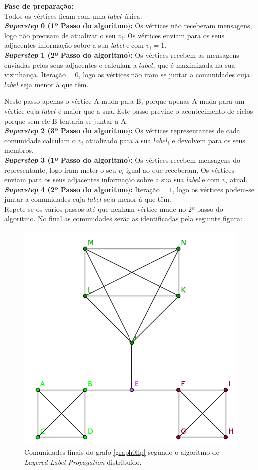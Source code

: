 {\bf Fase de preparação:}\\
Todos os vértices ficam com uma $label$ única. 
\\[0.25cm]
{\bf \textit{Superstep} 0  (1º Passo do algoritmo):}
Os vértices não receberam mensagens, logo não precisam de atualizar o seu $v_i$.
Os vértices enviam para os seus adjacentes informação sobre a sua 
\textit{label} e com $v_i=1$.
\\[0.25cm]
{\bf \textit{Superstep} 1 (2º Passo do algoritmo):}
Os vértices recebem as mensagens enviadas pelos seus adjacentes e calculam a 
$label_i$ que é maximizada na sua vizinhança. Iteração$ = 0$, 
logo os vértices não iram se juntar a comunidades cuja $label$ seja menor à que 
têm.

Neste passo apenas o vértice A muda para B, porque apenas A muda para um 
vértice cuja $label$ é maior que a sua. Este passo previne o acontecimento de 
ciclos porque sem ele B tentaria-se juntar a A.
\\[0.25cm]
{\bf \textit{Superstep} 2 (3º Passo do algoritmo):} Os vértices representantes 
de cada comunidade calculam o $v_i$ atualizado para a sua $label_i$ e devolvem 
para os seus membros.
\\[0.25cm]
{\bf \textit{Superstep} 3 (1º Passo do algoritmo):}
Os vértices recebem mensagens do representante, logo iram meter o seu $v_i$ 
igual ao que receberam.
Os vértices enviam para os seus adjacentes informação sobre a sua sua 
\textit{label} e com $v_i$ atual.
\\[0.25cm]
{\bf \textit{Superstep} 4 (2º Passo do algoritmo):}
Iteração$ = 1$, 
logo os vértices podem-se juntar a comunidades cuja $label$ seja menor à que 
têm.
\\[0.25cm]
Repete-se os vários passos até que nenhum vértice mude no 2º passo do 
algoritmo. No final as comunidades serão as identificadas pela seguinte figura:

\begin{figure}[h]
  \center
  \includegraphics{graph1_end}
  \caption{Comunidades finais do grafo \ref{graph0llp} segundo o algoritmo de 
\textit{Layered Label Propagation} distribuído.}
\end{figure}
